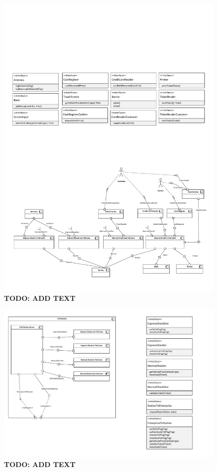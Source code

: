 \begin{figure}
\centerline{\includegraphics[width=\textwidth]{img/component_diagrams/ComponentDiagram_TollLane_interfaces}}
\caption{\textbf{TODO: ADD TEXT}}
\label{fig:cd_tli}
\end{figure}

\begin{figure}
\centerline{\includegraphics[width=\textwidth]{img/component_diagrams/ComponentDiagram_TollLaneToStationAndEnterprise}}
\caption{\textbf{TODO: ADD TEXT}}
\label{fig:cd_ts}
\end{figure}

